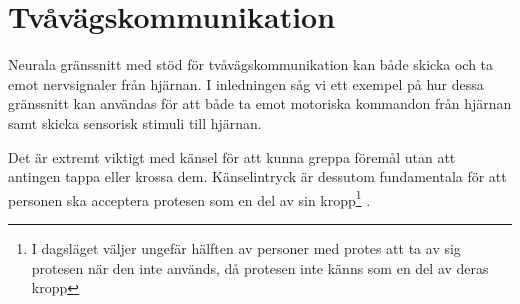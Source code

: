 \documentclass[12pt, a4paper]{article}
\begin{document}

\section{Tvåvägskommunikation}

Neurala gränssnitt med stöd för tvåvägskommunikation kan både skicka och ta emot nervsignaler från hjärnan. I inledningen såg vi ett exempel på hur dessa gränssnitt kan användas för att både ta emot motoriska kommandon från hjärnan samt skicka sensorisk stimuli till hjärnan.


Det är extremt viktigt med känsel för att kunna greppa föremål utan att antingen tappa eller krossa dem. Känselintryck är dessutom fundamentala för att personen ska acceptera protesen som en del av sin kropp\footnote{I dagsläget väljer ungefär hälften av personer med protes att ta av sig protesen när den inte används, då protesen inte känns som en del av deras kropp} \cite{prosthetic_operation}.

%
%
%
%
%
%
%


%
%
%
%
\end{document}
